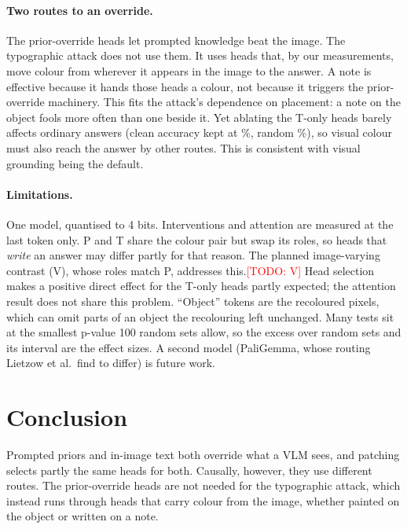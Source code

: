 \documentclass[10pt,twocolumn,letterpaper]{article}
\newcommand{\todo}[1]{\textcolor{red}{[TODO: #1]}}
\begin{document}
\paragraph{Two routes to an override.}
The prior-override heads let prompted knowledge beat the image. The typographic
attack does not use them. It uses heads that, by our measurements, move colour
from wherever it appears in the image to the answer. A note is effective because
it hands those heads a colour, not because it triggers the prior-override
machinery. This fits the attack's dependence on placement: a note on the object
fools more often than one beside it. Yet ablating the T-only heads barely affects ordinary
answers (clean accuracy kept at \hTwoCleanTO\%, random \hTwoCleanRandom\%), so
visual colour must also reach the answer by other routes. This is consistent with
visual grounding being the default.

\paragraph{Limitations.}
One model, quantised to 4 bits. Interventions and attention are measured at the
last token only. P and T share the colour pair but swap its roles, so heads that
\emph{write} an answer may differ partly for that reason. The planned
image-varying contrast (V), whose roles match P, addresses this.\todo{V} Head
selection makes a positive direct effect for the T-only heads partly expected;
the attention result does not share this problem. ``Object'' tokens are the
recoloured pixels, which can omit parts of an object the recolouring left
unchanged. Many tests sit at the smallest p-value 100 random sets allow, so the
excess over random sets and its interval are the effect sizes. A second model
(PaliGemma, whose routing Lietzow et al.\ find to differ) is future work.

\section{Conclusion}
Prompted priors and in-image text both override what a VLM sees, and patching
selects partly the same heads for both. Causally, however, they use different
routes. The prior-override heads are not needed for the typographic attack,
which instead runs through heads that carry colour from the image, whether
painted on the object or written on a note.



\end{document}
